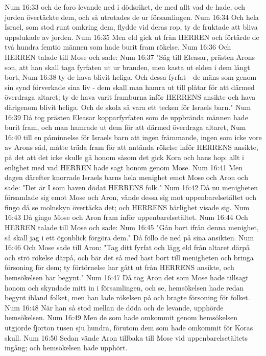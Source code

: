 Num 16:33  och de foro levande ned i dödsriket, de med allt vad de hade, och jorden övertäckte dem, och så utrotades de ur församlingen.
Num 16:34  Och hela Israel, som stod runt omkring dem, flydde vid deras rop, ty de fruktade att bliva uppslukade av jorden.
Num 16:35  Men eld gick ut från HERREN och förtärde de två hundra femtio männen som hade burit fram rökelse.
Num 16:36  Och HERREN talade till Mose och sade:
Num 16:37  "Säg till Eleasar, prästen Arons son, att han skall taga fyrfaten ut ur branden, men kasta ut elden i dem långt bort,
Num 16:38  ty de hava blivit heliga. Och dessa fyrfat - de mäns som genom sin synd förverkade sina liv - dem skall man hamra ut till plåtar för att därmed överdraga altaret; ty de hava varit framburna inför HERRENS ansikte och hava därigenom blivit heliga. Och de skola så vara ett tecken för Israels barn."
Num 16:39  Då tog prästen Eleasar kopparfyrfaten som de uppbrända männen hade burit fram, och man hamrade ut dem för att därmed överdraga altaret,
Num 16:40  till en påminnelse för Israels barn att ingen främmande, ingen som icke vore av Arons säd, måtte träda fram för att antända rökelse inför HERRENS ansikte, på det att det icke skulle gå honom såsom det gick Kora och hans hop: allt i enlighet med vad HERREN hade sagt honom genom Mose.
Num 16:41  Men dagen därefter knorrade Israels barns hela menighet emot Mose och Aron och sade: "Det är I som haven dödat HERRENS folk."
Num 16:42  Då nu menigheten församlade sig emot Mose och Aron, vände dessa sig mot uppenbarelsetältet och fingo då se molnskyn övertäcka det; och HERRENS härlighet visade sig.
Num 16:43  Då gingo Mose och Aron fram inför uppenbarelsetältet.
Num 16:44  Och HERREN talade till Mose och sade:
Num 16:45  "Gån bort ifrån denna menighet, så skall jag i ett ögonblick förgöra dem." Då föllo de ned på sina ansikten.
Num 16:46  Och Mose sade till Aron: "Tag ditt fyrfat och lägg eld från altaret därpå och strö rökelse därpå, och bär det så med hast bort till menigheten och bringa försoning för dem; ty förtörnelse har gått ut från HERRENS ansikte, och hemsökelsen har begynt."
Num 16:47  Då tog Aron det som Mose hade tillsagt honom och skyndade mitt in i församlingen, och se, hemsökelsen hade redan begynt ibland folket, men han lade rökelsen på och bragte försoning för folket.
Num 16:48  När han så stod mellan de döda och de levande, upphörde hemsökelsen.
Num 16:49  Men de som hade omkommit genom hemsökelsen utgjorde fjorton tusen sju hundra, förutom dem som hade omkommit för Koras skull.
Num 16:50  Sedan vände Aron tillbaka till Mose vid uppenbarelsetältets ingång; och hemsökelsen hade upphört.
